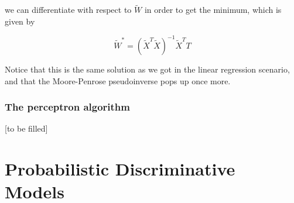 \documentclass{report}
\begin{document}
we can differentiate with respect to $\widetilde{W}$ in order to get the minimum, which is given by

\[\widetilde{W}^* = (\widetilde{X}^T\widetilde{X})^{-1}\widetilde{X}^TT\]

Notice that this is the same solution as we got in the linear regression scenario, and that the Moore-Penrose pseudoinverse pops up once more.

\subsubsection{The perceptron algorithm}

[to be filled]

\section{Probabilistic Discriminative Models}
\end{document}
